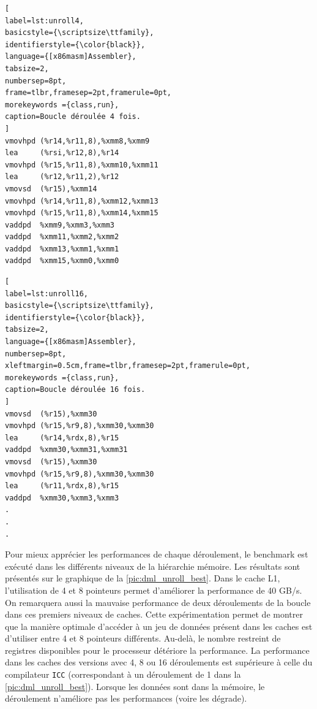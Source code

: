 \begin{minipage}{.45\textwidth}
\begin{lstlisting}[
label=lst:unroll4,
basicstyle={\scriptsize\ttfamily},
identifierstyle={\color{black}},
language={[x86masm]Assembler},
tabsize=2,
numbersep=8pt,
frame=tlbr,framesep=2pt,framerule=0pt,
morekeywords ={class,run},
caption=Boucle déroulée 4 fois.
]
vmovhpd (%r14,%r11,8),%xmm8,%xmm9
lea     (%rsi,%r12,8),%r14
vmovhpd (%r15,%r11,8),%xmm10,%xmm11
lea     (%r12,%r11,2),%r12
vmovsd  (%r15),%xmm14
vmovhpd (%r14,%r11,8),%xmm12,%xmm13
vmovhpd (%r15,%r11,8),%xmm14,%xmm15
vaddpd  %xmm9,%xmm3,%xmm3
vaddpd  %xmm11,%xmm2,%xmm2
vaddpd  %xmm13,%xmm1,%xmm1
vaddpd  %xmm15,%xmm0,%xmm0
\end{lstlisting}
\end{minipage}%
\hfill
%
\begin{minipage}{.45\textwidth}
\begin{lstlisting}[
label=lst:unroll16,
basicstyle={\scriptsize\ttfamily},
identifierstyle={\color{black}},
tabsize=2,
language={[x86masm]Assembler},
numbersep=8pt,
xleftmargin=0.5cm,frame=tlbr,framesep=2pt,framerule=0pt,
morekeywords ={class,run},
caption=Boucle déroulée 16 fois.
]
vmovsd  (%r15),%xmm30
vmovhpd (%r15,%r9,8),%xmm30,%xmm30
lea     (%r14,%rdx,8),%r15
vaddpd  %xmm30,%xmm31,%xmm31
vmovsd  (%r15),%xmm30
vmovhpd (%r15,%r9,8),%xmm30,%xmm30
lea     (%r11,%rdx,8),%r15
vaddpd  %xmm30,%xmm3,%xmm3
. 
. 
. 
\end{lstlisting}
\end{minipage}
    
        
        Pour mieux apprécier les performances de chaque déroulement, le benchmark est exécuté dans les différents niveaux de la hiérarchie mémoire. Les résultats sont présentés sur le graphique de la \autoref{pic:dml_unroll_best}. Dans le cache L1, l'utilisation de 4 et 8 pointeurs permet d'améliorer la performance de 40 GB/s. On remarquera aussi la mauvaise performance de deux déroulements de la boucle dans ces premiers niveaux de caches. Cette expérimentation permet de montrer que la manière optimale d'accéder à un jeu de données présent dans les caches est d'utiliser entre 4 et 8 pointeurs différents. Au-delà, le nombre restreint de registres disponibles pour le processeur détériore la performance. La performance dans les caches des versions avec 4, 8 ou 16 déroulements est supérieure à celle du compilateur \verb|ICC| (correspondant à un déroulement de 1 dans la \autoref{pic:dml_unroll_best}). Lorsque les données sont dans la mémoire, le déroulement n'améliore pas les performances (voire les dégrade). 
    
